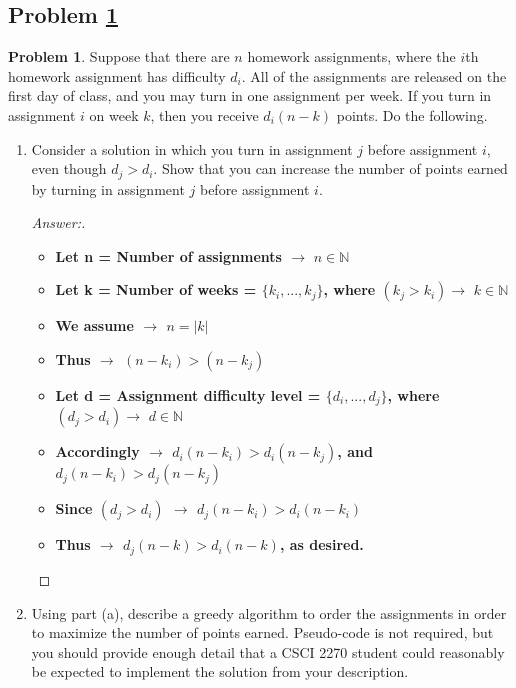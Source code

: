 \documentclass[11pt]{article}
\theoremstyle{definition}
\theoremstyle{definition}
\newtheorem{required}{Problem}
\theoremstyle{definition}
\begin{document}
\subsection{Problem \ref{DFS1}}
\begin{required} \label{DFS1}
Suppose that there are $n$ homework assignments, where the $i$th homework assignment has difficulty $d_{i}$. All of the assignments are released on the first day of class, and you may turn in one assignment per week. If you turn in assignment $i$ on week $k$, then you receive $d_{i}(n-k)$ points. Do the following.

\begin{enumerate}[label=(\alph*)]
\item Consider a solution in which you turn in assignment $j$ before assignment $i$, even though $d_{j} > d_{i}$. Show that you can increase the number of points earned by turning in assignment $j$ before assignment $i$.

\begin{proof}[Answer:] \
\begin{itemize}
\item \textbf{Let n = Number of assignments $\to$} $n\in\mathbb{N}$
\item \textbf{Let k = Number of weeks = $\{k_i,...,k_j\}$, where $(k_j > k_i) \to$} $k\in\mathbb{N}$
\item \textbf{We assume $\to$ $n = |k|$}
\item \textbf{Thus $\to$ $(n - k_i) > (n - k_j)$} \\
\item \textbf{Let d = Assignment difficulty level = $\{d_i,...,d_j\}$, where $(d_j > d_i) \to$} $d\in\mathbb{N}$
\item \textbf{Accordingly $\to$ $d_i(n - k_i) > d_i(n - k_j)$, and $d_j(n - k_i) > d_j(n - k_j)$}
\item \textbf{Since $(d_j > d_i)$ $\to$ $d_j(n - k_i) > d_i(n - k_i)$} \\
\item \textbf{Thus $\to$ $d_j(n - k) > d_i(n - k)$, as desired.}
\end{itemize}
\end{proof}


\vskip 50pt
\item Using part (a), describe a greedy algorithm to order the assignments in order to maximize the number of points earned. Pseudo-code is not required, but you should provide enough detail that a CSCI 2270 student could reasonably be expected to implement the solution from your description.


\end{enumerate}
\end{required}
\end{document}
